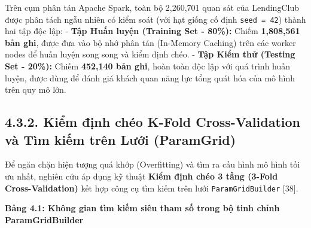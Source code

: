 \documentclass[
  13pt,
  a4paper,
]{report}
\begin{document}
Trên cụm phân tán Apache Spark, toàn bộ 2,260,701 quan sát của
LendingClub được phân tách ngẫu nhiên có kiểm soát (với hạt giống cố
định \texttt{seed\ =\ 42}) thành hai tập độc lập: - \textbf{Tập Huấn
luyện (Training Set - 80\%):} Chiếm \textbf{1,808,561 bản ghi}, được đưa
vào bộ nhớ phân tán (In-Memory Caching) trên các worker nodes để huấn
luyện song song và kiểm định chéo. - \textbf{Tập Kiểm thử (Testing Set -
20\%):} Chiếm \textbf{452,140 bản ghi}, hoàn toàn độc lập với quá trình
huấn luyện, được dùng để đánh giá khách quan năng lực tổng quát hóa của
mô hình trên quy mô lớn.

\subsection{4.3.2. Kiểm định chéo K-Fold Cross-Validation và Tìm kiếm
trên Lưới
(ParamGrid)}\label{kiux1ec3m-ux111ux1ecbnh-chuxe9o-k-fold-cross-validation-vuxe0-tuxecm-kiux1ebfm-truxean-lux1b0ux1edbi-paramgrid}

Để ngăn chặn hiện tượng quá khớp (Overfitting) và tìm ra cấu hình mô
hình tối ưu nhất, nghiên cứu áp dụng kỹ thuật \textbf{Kiểm định chéo 3
tầng (3-Fold Cross-Validation)} kết hợp công cụ tìm kiếm trên lưới
\texttt{ParamGridBuilder} {[}38{]}.

\textbf{Bảng 4.1: Không gian tìm kiếm siêu tham số trong bộ tinh chỉnh
ParamGridBuilder}
\end{document}
